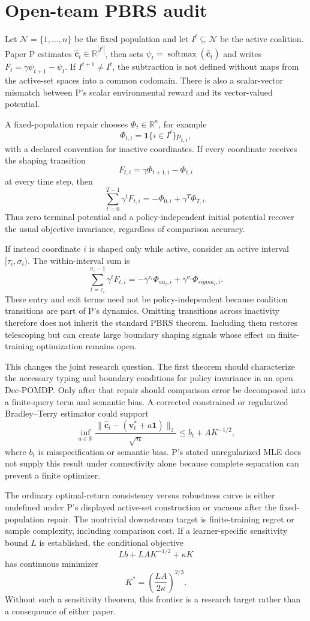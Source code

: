 \section*{Open-team PBRS audit}

Let \(\mathcal N=\{1,\ldots,n\}\) be the fixed population and let
\(I^t\subseteq\mathcal N\) be the active coalition. Paper P estimates
\(\hat{\boldsymbol c}_t\in\mathbb R^{|I^t|}\), then sets
\(\psi_t=\operatorname{softmax}(\hat{\boldsymbol c}_t)\) and writes
\(F_t=\gamma\psi_{t+1}-\psi_t\). If \(I^{t+1}\ne I^t\), the subtraction
is not defined without maps from the active-set spaces into a common codomain.
There is also a scalar-vector mismatch between P's scalar environmental reward
and its vector-valued potential.

A fixed-population repair chooses \(\Phi_t\in\mathbb R^n\), for example
\[
  \Phi_{t,i}=\mathbf 1\{i\in I^t\}p_{t,i},
\]
with a declared convention for inactive coordinates. If every coordinate
receives the shaping transition
\[
  F_{t,i}=\gamma\Phi_{t+1,i}-\Phi_{t,i}
\]
at every time step, then
\[
  \sum_{t=0}^{T-1}\gamma^tF_{t,i}
  =-\Phi_{0,i}+\gamma^T\Phi_{T,i}.
\]
Thus zero terminal potential and a policy-independent initial potential recover
the usual objective invariance, regardless of comparison accuracy.

If instead coordinate \(i\) is shaped only while active, consider an active
interval \([\tau_i,\sigma_i)\). The within-interval sum is
\[
  \sum_{t=\tau_i}^{\sigma_i-1}\gamma^tF_{t,i}
  =-\gamma^{\tau_i}\Phi_{	au_i,i}
   +\gamma^{\sigma_i}\Phi_{sigma_i,i}.
\]
These entry and exit terms need not be policy-independent because coalition
transitions are part of P's dynamics. Omitting transitions across inactivity
therefore does not inherit the standard PBRS theorem. Including them restores
telescoping but can create large boundary shaping signals whose effect on
finite-training optimization remains open.

This changes the joint research question. The first theorem should characterize
the necessary typing and boundary conditions for policy invariance in an open
Dec-POMDP. Only after that repair should comparison error be decomposed into a
finite-query term and semantic bias. A corrected constrained or regularized
Bradley--Terry estimator could support
\[
  \inf_{a\in\mathbb R}
  \frac{\|\hat{\boldsymbol c}_t-(\boldsymbol v_t^*+a\mathbf 1)\|_2}{\sqrt n}
  \le b_t+A K^{-1/2},
\]
where \(b_t\) is misspecification or semantic bias. P's stated unregularized
MLE does not supply this result under connectivity alone because complete
separation can prevent a finite optimizer.

The ordinary optimal-return consistency versus robustness curve is either
undefined under P's displayed active-set construction or vacuous after the
fixed-population repair. The nontrivial downstream target is finite-training
regret or sample complexity, including comparison cost. If a learner-specific
sensitivity bound \(L\) is established, the conditional objective
\[
  Lb+LAK^{-1/2}+\kappa K
\]
has continuous minimizer
\[
  K^*=\left(\frac{LA}{2\kappa}\right)^{2/3}.
\]
Without such a sensitivity theorem, this frontier is a research target rather
than a consequence of either paper.
